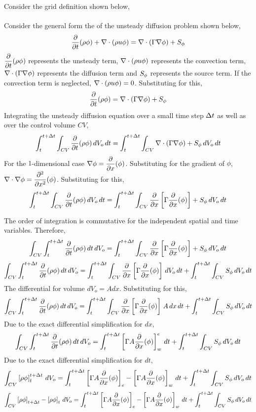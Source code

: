\documentclass[class=report, 12pt, crop=false]{standalone}
\begin{document}
\begin{center}


Consider the grid definition shown below,
\\~\\Consider the general form the of the unsteady diffusion problem shown below,
$$\frac{\partial}{\partial t}(\rho \phi) + \nabla\cdot(\rho u \phi) = \nabla\cdot(\Gamma \nabla\phi) + S_\phi$$
$\displaystyle{\frac{\partial}{\partial t}(\rho \phi)}$ represents the unsteady term, $\displaystyle{\nabla\cdot(\rho u \phi)}$ represents the convection term, $\displaystyle{\nabla\cdot(\Gamma \nabla\phi)}$ represents the diffusion term and $\displaystyle{S_\phi}$ represents the source term. If the convection term is neglected, $\displaystyle{\nabla\cdot(\rho u \phi)=0}$. Substituting for this,
$$\frac{\partial}{\partial t}(\rho \phi) = \nabla\cdot(\Gamma \nabla\phi) + S_\phi$$
Integrating the unsteady diffusion equation over a small time step $\displaystyle{\Delta t}$ as well as over the control volume $CV$,
$$\int^{t+\Delta t}_{t}\int_{CV}\frac{\partial}{\partial t}(\rho \phi)\,dV_o\,dt = \int^{t+\Delta t}_{t}\int_{CV}\nabla\cdot(\Gamma \nabla\phi) + S_\phi\,dV_o\,dt$$
For the $1$-dimensional case $\displaystyle{\nabla\phi} = \frac{\partial}{\partial x}(\phi)$. Substituting for the gradient of $\phi$, $\displaystyle{\nabla\cdot\nabla\phi = \frac{\partial^2}{\partial x^2}(\phi)}$. Substituting for this,
$$\int^{t+\Delta t}_{t}\int_{CV}\frac{\partial}{\partial t}(\rho \phi)\,dV_o\,dt = \int^{t+\Delta t}_{t}\int_{CV}\frac{\partial}{\partial x}\left[\Gamma \frac{\partial}{\partial x}(\phi)\right] + S_\phi\,dV_o\,dt$$

The order of integration is commutative for the independent spatial and time variables. Therefore,
$$\int_{CV}\int^{t+\Delta t}_{t}\frac{\partial}{\partial t}(\rho \phi)\,dt\,dV_o = \int^{t+\Delta t}_{t}\int_{CV}\frac{\partial}{\partial x}\left[\Gamma \frac{\partial}{\partial x}(\phi)\right] + S_\phi\,dV_o\,dt$$
$$\int_{CV}\int^{t+\Delta t}_{t}\frac{\partial}{\partial t}(\rho \phi)\,dt\,dV_o = \int^{t+\Delta t}_{t}\int_{CV}\frac{\partial}{\partial x}\left[\Gamma \frac{\partial}{\partial x}(\phi)\right]\,dV_o\,dt + \int^{t+\Delta t}_{t}\int_{CV}S_\phi\,dV_o\,dt$$
The differential for volume $dV_o = A dx$. Substituting for this,
$$\int_{CV}\int^{t+\Delta t}_{t}\frac{\partial}{\partial t}(\rho \phi)\,dt\,dV_o = \int^{t+\Delta t}_{t}\int_{CV}\frac{\partial}{\partial x}\left[\Gamma \frac{\partial}{\partial x}(\phi)\right]\,A\,dx\,dt + \int^{t+\Delta t}_{t}\int_{CV}S_\phi\,dV_o\,dt$$
Due to the exact differential simplification for $dx$,
$$\int_{CV}\int^{t+\Delta t}_{t}\frac{\partial}{\partial t}(\rho \phi)\,dt\,dV_o = \int^{t+\Delta t}_{t}\left[\Gamma A\frac{\partial}{\partial x}(\phi)\right]^{e}_{w}\,dt + \int^{t+\Delta t}_{t}\int_{CV}S_\phi\,dV_o\,dt$$
Due to the exact differential simplification for $dt$,
$$\int_{CV}\left[\rho \phi\right]^{t+\Delta t}_{t}\,dV_o = \int^{t+\Delta t}_{t}\left[\Gamma A\frac{\partial}{\partial x}(\phi)\right]_{e} - \left[\Gamma A\frac{\partial}{\partial x}(\phi)\right]_{w}\,dt + \int^{t+\Delta t}_{t}\int_{CV}S_\phi\,dV_o\,dt$$
$$\int_{CV}\left[\rho \phi\right]_{t+\Delta t} - \left[\rho \phi\right]_{t}\,dV_o = \int^{t+\Delta t}_{t}\left[\Gamma A\frac{\partial}{\partial x}(\phi)\right]_{e} - \left[\Gamma A\frac{\partial}{\partial x}(\phi)\right]_{w}\,dt + \int^{t+\Delta t}_{t}\int_{CV}S_\phi\,dV_o\,dt$$


\end{center}
\end{document}
